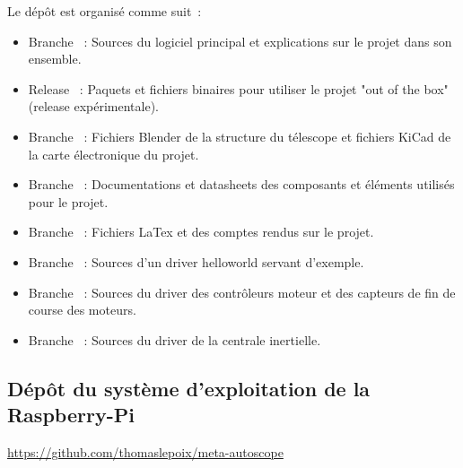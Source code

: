 Le dépôt est organisé comme suit~:
\begin{itemize}[label=$\bullet$]
	\item Branche {\href{https://github.com/thibaudledo/Autoscope/tree/master}{}}~: Sources du logiciel principal et explications sur le projet dans son ensemble.
	\item Release {\href{https://github.com/thibaudledo/Autoscope/releases}{}}~: Paquets et fichiers binaires pour utiliser le projet "out of the box" (release expérimentale).
	\item Branche {\href{https://github.com/thibaudledo/Autoscope/tree/hardware}{}}~: Fichiers Blender de la structure du télescope et fichiers KiCad de la carte électronique du projet.
	\item Branche {\href{https://github.com/thibaudledo/Autoscope/tree/doc}{}}~: Documentations et datasheets des composants et éléments utilisés pour le projet.
	\item Branche {\href{https://github.com/thibaudledo/Autoscope/tree/latex}{}}~: Fichiers LaTex et  des comptes rendus sur le projet.
	\item Branche {\href{https://github.com/thibaudledo/Autoscope/tree/hello_mod}{}}~: Sources d'un driver helloworld servant d'exemple.
	\item Branche {\href{https://github.com/thibaudledo/Autoscope/tree/a4988_mod}{}}~: Sources du driver des contrôleurs moteur et des capteurs de fin de course des moteurs.
	\item Branche {\href{https://github.com/thibaudledo/Autoscope/tree/mpu_9250_mod}{}}~: Sources du driver de la centrale inertielle.
	\end{itemize}

\newpage
\subsection{Dépôt du système d'exploitation de la Raspberry-Pi}

\url{https://github.com/thomaslepoix/meta-autoscope}

\vspace{1cm}

